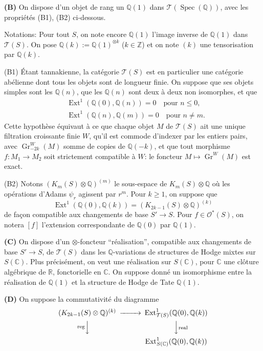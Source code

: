 \documentclass[12pt,a4paper]{article}
\theoremstyle{plain}
\theoremstyle{definition}
\theoremstyle{remark}
\DeclareMathOperator{\Ext}{Ext}
\DeclareMathOperator{\reg}{reg}
\DeclareMathOperator{\Spec}{Spec}
\newcommand{\Q}{\mathbb{Q}}
\newcommand{\R}{\mathbb{R}}
\newcommand{\C}{\mathbb{C}}
\newcommand{\Z}{\mathbb{Z}}
\begin{document}
\textbf{(B)} On dispose d'un objet de rang un $\Q(1)$ dans $\mathcal{T}(\Spec(\Q))$, avec les propri{\'e}t{\'e}s (B1), (B2) ci-dessous.

Notations: Pour tout $S$, on note encore $\Q(1)$ l'image inverse de $\Q(1)$ dans $\mathcal{T}(S)$. On pose $\Q(k):=\Q(1)^{\otimes k}$ ($k\in\Z$) et on note $(k)$ une tensorisation par $\Q(k)$.

(B1) {\'E}tant tannakienne, la cat{\'e}gorie $\mathcal{T}(S)$ est en particulier une cat{\'e}gorie ab{\'e}lienne dont tous les objets sont de longueur finie. On suppose que ses objets simples sont les $\Q(n)$, que les $\Q(n)$ sont deux {\`a} deux non isomorphes, et que
\begin{align*}
&\Ext^1(\Q(0),\Q(n))=0 \quad \text{pour }n\leq 0,\\
&\Ext^1(\Q(n),\Q(m))=0 \quad \text{pour }n\neq m.
\end{align*}
Cette hypoth{\`e}se {\'e}quivaut {\`a} ce que chaque objet $M$ de $\mathcal{T}(S)$ ait une unique filtration croissante finie $W$, qu'il est commode d'indexer par les entiers pairs, avec $\operatorname{Gr}^W_{-2k}(M)$ somme de copies de $\Q(-k)$, et que tout morphisme $f:M_1\to M_2$ soit strictement compatible {\`a} $W$: le foncteur $M\mapsto\operatorname{Gr}^W(M)$ est exact.

(B2) Notons $(K_m(S)\otimes\Q)^{(m)}$ le sous-espace de $K_m(S)\otimes\Q$ o{\`u} les op{\'e}rations d'Adams $\psi_r$ agissent par $r^m$. Pour $k\geq 1$, on suppose que
\begin{equation*}
\Ext^1(\Q(0),\Q(k)) = (K_{2k-1}(S)\otimes\Q)^{(k)}
\end{equation*}
de fa\c{c}on compatible aux changements de base $S'\to S$. Pour $f\in\mathcal{O}^*(S)$, on notera $[f]$ l'extension correspondante de $\Q(0)$ par $\Q(1)$.

\textbf{(C)} On dispose d'un $\otimes$-foncteur ``r{\'e}alisation'', compatible aux changements de base $S'\to S$, de $\mathcal{T}(S)$ dans les $\Q$-variations de structures de Hodge mixtes sur $S(\C)$. Plus pr{\'e}cis\'ement, on veut une r{\'e}alisation sur $S(\C)$, pour $\C$ une cl{\^o}ture alg{\'e}brique de $\R$, fonctorielle en $\C$. On suppose donn{\'e} un isomorphisme entre la r{\'e}alisation de $\Q(1)$ et la structure de Hodge de Tate $\Q(1)$.

\textbf{(D)} On suppose la commutativit{\'e} du diagramme
\begin{equation*}
\begin{CD}
(K_{2k-1}(S)\otimes\Q)^{(k)} @>>> \Ext^1_{\mathcal{T}(S)}(\Q(0),\Q(k)) \\
@V{\reg}VV @VV{\text{real}}V \\
@. \Ext^1_{S(\C)}(\Q(0),\Q(k))
\end{CD}
\end{equation*}
\end{document}
